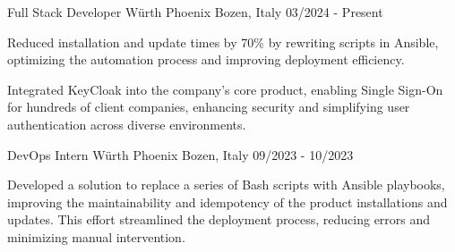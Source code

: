 
\begin{cventries}

	\cventry
	{Full Stack Developer} %
	{Würth Phoenix} %
	{Bozen, Italy} %
	{03/2024 - Present} %
	{
		\begin{cvitems} %
			\item Reduced installation and update times by 70\% by rewriting scripts in Ansible, optimizing the automation process and improving deployment efficiency.
			\item Integrated KeyCloak into the company's core product, enabling Single Sign-On for hundreds of client companies, enhancing security and simplifying user authentication across diverse environments.
		\end{cvitems}
	}


	\cventry
	{DevOps Intern} %
	{Würth Phoenix} %
	{Bozen, Italy} %
	{09/2023 - 10/2023} %
	{
		\begin{cvitems} %
			\item Developed a solution to replace a series of Bash scripts with Ansible playbooks, improving the maintainability and idempotency of the product installations and updates. This effort streamlined the deployment process, reducing errors and minimizing manual intervention.
		\end{cvitems}
	}

\end{cventries}

